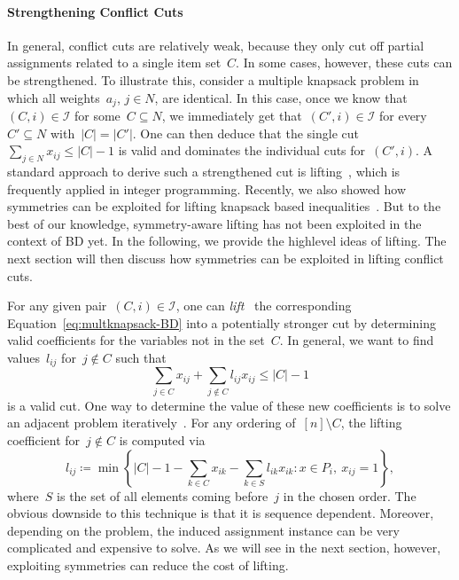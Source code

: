 \documentclass[a4paper,10pt]{article}
\newcommand{\lift}{l}
\newcommand{\define}{\coloneqq}
\newcommand{\card}[1]{\left\lvert #1 \right\rvert}
\newcommand{\brackets}[1]{\left\{ #1 \right\}}
\theoremstyle{definition}
\begin{document}
\paragraph{Strengthening Conflict Cuts}
In general, conflict cuts are relatively weak, because they only cut off partial assignments related to a single item set~$C$.
In some cases, however, these cuts can be strengthened.
To illustrate this, consider a multiple knapsack problem in which all weights~$a_j$, $j \in N$, are identical.
In this case, once we know that~$(C, i)\in \mathcal{I}$ for some~$C\subseteq N$, we immediately get that~$(C',i) \in \mathcal{I}$ for every~$C' \subseteq N$ with~$|C| = |C'|$.
One can then deduce that the single cut~$\sum_{j\in N} x_{ij} \leq |C|- 1$ is valid and dominates the individual cuts for~$(C',i)$.
A standard approach to derive such a strengthened cut is lifting~\cite{padberg1975note}, which is frequently applied in integer programming.
Recently, we also showed how symmetries can be exploited for lifting knapsack based inequalities~\cite{hojny2020knapsack}.
But to the best of our knowledge, symmetry-aware lifting has not been exploited in the context of BD yet.
In the following, we provide the highlevel ideas of lifting.
The next section will then discuss how symmetries can be exploited in lifting conflict cuts.

For any given pair~$(C, i)\in\mathcal{I}$, one can \emph{lift}~\cite{kaparis2010separation} the corresponding Equation~\eqref{eq:multknapsack-BD} into a potentially stronger cut by determining valid coefficients for the variables not in the set~$C$.
In general, we want to find values~$\lift_{ij}$ for~$j\notin C$ such that
\begin{equation}
  \sum_{j\in C} x_{ij} + \sum_{j\notin C} \lift_{ij} x_{ij} \leq \card{C}-1
  \label{eq:LiftedNoGoodCut}
\end{equation}
is a valid cut.
One way to determine the value of these new coefficients is to solve an adjacent problem iteratively~\cite{padberg1975note,zemel1989easily}.
For any ordering of~$[n]\setminus C$, the lifting coefficient for~$j\notin C$ is computed via
\begin{equation}
  \label{eq:sequence-lifting}
  \lift_{ij} \define \min\brackets{
    |C| - 1 - \sum_{k\in C} x_{ik} - \sum_{k\in S} \lift_{ik} x_{ik} : x\in P_i,\ x_{ij} = 1
  },
\end{equation}
where~$S$ is the set of all elements coming before~$j$ in the chosen order.
The obvious downside to this technique is that it is sequence dependent.
Moreover, depending on the problem, the induced assignment instance can be very complicated and expensive to solve.
As we will see in the next section, however, exploiting symmetries can reduce the cost of lifting.
\end{document}
